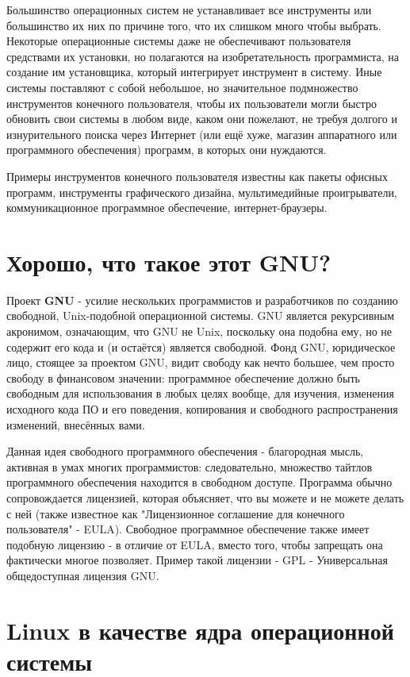 \documentclass[10pt]{book}
\begin{document}
Большинство операционных систем не устанавливает все инструменты или большинство их них по причине того, что их слишком много чтобы выбрать. Некоторые операционные системы даже не обеспечивают пользователя средствами их установки, но полагаются на изобретательность программиста, на создание им установщика, который интегрирует инструмент в систему. Иные  системы поставляют с собой небольшое, но значительное подмножество инструментов конечного пользователя, чтобы их пользователи могли быстро обновить свои системы в любом виде, каком они пожелают, не требуя долгого и изнурительного поиска через Интернет (или ещё хуже, магазин аппаратного или программного обеспечения)  программ, в которых они нуждаются.

Примеры инструментов конечного пользователя известны как пакеты офисных программ, инструменты графического дизайна, мультимедийные проигрыватели, коммуникационное программное обеспечение, интернет-браузеры.

\section{Хорошо, что такое этот GNU?}

Проект {\color{gentoo}\textbf{GNU}} - усилие нескольких программистов и разработчиков по созданию свободной,  Unix-подобной операционной системы. GNU является рекурсивным акронимом, означающим, что GNU не Unix, поскольку она подобна ему, но не содержит его кода и (и остаётся) является свободной. Фонд GNU, юридическое лицо, стоящее за проектом GNU, видит свободу как нечто большее, чем просто свободу в финансовом значении: программное обеспечение должно быть свободным для использования в любых целях вообще,  для изучения,  изменения исходного кода ПО и его поведения, копирования и свободного распространения изменений, внесённых вами.

Данная идея свободного программного обеспечения - благородная мысль, активная в умах многих программистов: следовательно, множество тайтлов программного обеспечения находится в свободном доступе. Программа обычно сопровождается лицензией, которая объясняет, что вы можете и не можете делать с ней (также известное как "Лицензионное соглашение для конечного пользователя" - EULA). Свободное программное обеспечение также имеет подобную лицензию - в отличие от EULA, вместо того, чтобы запрещать она фактически многое позволяет. Пример такой лицензии - GPL - Универсальная общедоступная лицензия GNU.

\section{Linux в качестве ядра операционной системы}
\end{document}
